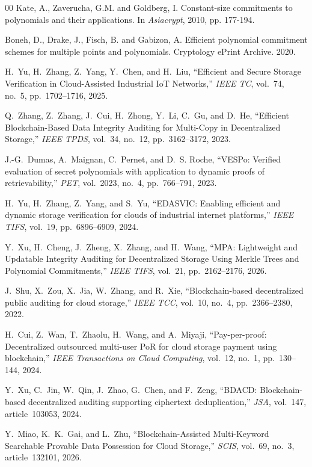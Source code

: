 \documentclass[lettersize,journal]{IEEEtran}
\begin{document}
\begin{thebibliography}{00}
Kate, A., Zaverucha, G.M. and Goldberg, I. Constant-size commitments to polynomials and their applications. In \emph{Asiacrypt}, 2010, pp. 177-194.

Boneh, D., Drake, J., Fisch, B. and Gabizon, A. Efficient polynomial commitment schemes for multiple points and polynomials. Cryptology ePrint Archive. 2020.

H.~Yu, H.~Zhang, Z.~Yang, Y.~Chen, and H.~Liu,
``Efficient and Secure Storage Verification in Cloud-Assisted Industrial IoT Networks,''
\emph{IEEE TC}, vol.~74, no.~5, pp.~1702--1716, 2025.

Q.~Zhang, Z.~Zhang, J.~Cui, H.~Zhong, Y.~Li, C.~Gu, and D.~He,
``Efficient Blockchain-Based Data Integrity Auditing for Multi-Copy in Decentralized Storage,''
\emph{IEEE TPDS}, vol.~34, no.~12, pp.~3162--3172, 2023.

J.-G.~Dumas, A.~Maignan, C.~Pernet, and D.~S. Roche,
``VESPo: Verified evaluation of secret polynomials with application to dynamic proofs of retrievability,''
\emph{PET}, vol.~2023, no.~4, pp.~766--791, 2023.

H.~Yu, H.~Zhang, Z.~Yang, and S.~Yu,
``EDASVIC: Enabling efficient and dynamic storage verification for clouds of industrial internet platforms,''
\emph{IEEE TIFS}, vol.~19, pp.~6896--6909, 2024.

Y.~Xu, H.~Cheng, J.~Zheng, X.~Zhang, and H.~Wang,
``MPA: Lightweight and Updatable Integrity Auditing for Decentralized Storage Using Merkle Trees and Polynomial Commitments,''
\emph{IEEE TIFS}, vol.~21, pp.~2162--2176, 2026.

J.~Shu, X.~Zou, X.~Jia, W.~Zhang, and R.~Xie,
``Blockchain-based decentralized public auditing for cloud storage,''
\emph{IEEE TCC}, vol.~10, no.~4, pp.~2366--2380, 2022.

H.~Cui, Z.~Wan, T.~Zhaolu, H.~Wang, and A.~Miyaji,
``Pay-per-proof: Decentralized outsourced multi-user PoR for cloud storage payment using blockchain,''
\emph{IEEE Transactions on Cloud Computing}, vol.~12, no.~1, pp.~130--144, 2024.

Y.~Xu, C.~Jin, W.~Qin, J.~Zhao, G.~Chen, and F.~Zeng,
``BDACD: Blockchain-based decentralized auditing supporting ciphertext deduplication,''
\emph{JSA}, vol.~147, article~103053, 2024.

Y.~Miao, K.~K.~Gai, and L.~Zhu,
``Blockchain-Assisted Multi-Keyword Searchable Provable Data Possession for Cloud Storage,''
\emph{SCIS}, vol.~69, no.~3, article~132101, 2026.


\end{thebibliography}
\end{document}
